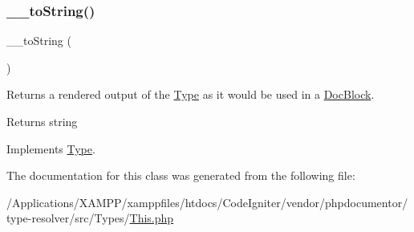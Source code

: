 \subsubsection{\texorpdfstring{\+\_\+\+\_\+to\+String()}{\_\_toString()}}
{\footnotesize\ttfamily \+\_\+\+\_\+to\+String (\begin{DoxyParamCaption}{ }\end{DoxyParamCaption})}

Returns a rendered output of the \mbox{\hyperlink{interfacephp_documentor_1_1_reflection_1_1_type}{Type}} as it would be used in a \mbox{\hyperlink{classphp_documentor_1_1_reflection_1_1_doc_block}{Doc\+Block}}.

\begin{DoxyReturn}{Returns}
string 
\end{DoxyReturn}


Implements \mbox{\hyperlink{interfacephp_documentor_1_1_reflection_1_1_type_a7516ca30af0db3cdbf9a7739b48ce91d}{Type}}.



The documentation for this class was generated from the following file\+:\begin{DoxyCompactItemize}
\item 
/\+Applications/\+X\+A\+M\+P\+P/xamppfiles/htdocs/\+Code\+Igniter/vendor/phpdocumentor/type-\/resolver/src/\+Types/\mbox{\hyperlink{_this_8php}{This.\+php}}\end{DoxyCompactItemize}
